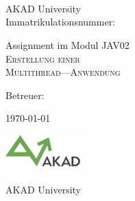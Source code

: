 

\begin{titlepage}


\vspace{5cm}

\Name \\ 
\Strasse \\ 
\PlzOrt\\ 
\href{mailto:\Email}{\Email}

AKAD University\\
Immatrikulationsnummer: \Immatrikulationsnummer

\vfill

Assignment im Modul JAV02\\
\LARGE
\textsc{Erstellung einer\\
Multithread—Anwendung\\
}

\vfill

\normalsize

Betreuer: \Betreuer

\today %

\vfill

\includegraphics[width=3cm]{akad_logo.png}  

AKAD University 

\end{titlepage}



\normalsize
